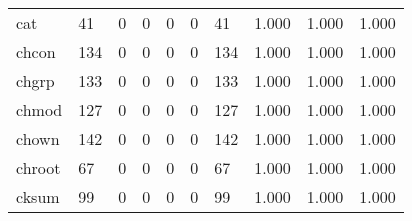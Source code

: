 \begin{longtable}{lp{1.3cm}p{1.3cm}p{1.3cm}p{1.3cm}p{1.3cm}p{1.3cm}p{1.3cm}p{1.3cm}p{1.3cm}}
cat       &                     41 &                                             0 &                                            0 &                                           0 &                                            0 &                                         41 &                                1.000 &                                  1.000 &                                1.000 \\
chcon     &                    134 &                                             0 &                                            0 &                                           0 &                                            0 &                                        134 &                                1.000 &                                  1.000 &                                1.000 \\
chgrp     &                    133 &                                             0 &                                            0 &                                           0 &                                            0 &                                        133 &                                1.000 &                                  1.000 &                                1.000 \\
chmod     &                    127 &                                             0 &                                            0 &                                           0 &                                            0 &                                        127 &                                1.000 &                                  1.000 &                                1.000 \\
chown     &                    142 &                                             0 &                                            0 &                                           0 &                                            0 &                                        142 &                                1.000 &                                  1.000 &                                1.000 \\
chroot    &                     67 &                                             0 &                                            0 &                                           0 &                                            0 &                                         67 &                                1.000 &                                  1.000 &                                1.000 \\
cksum     &                     99 &                                             0 &                                            0 &                                           0 &                                            0 &                                         99 &                                1.000 &                                  1.000 &                                1.000 \\

\end{longtable}
